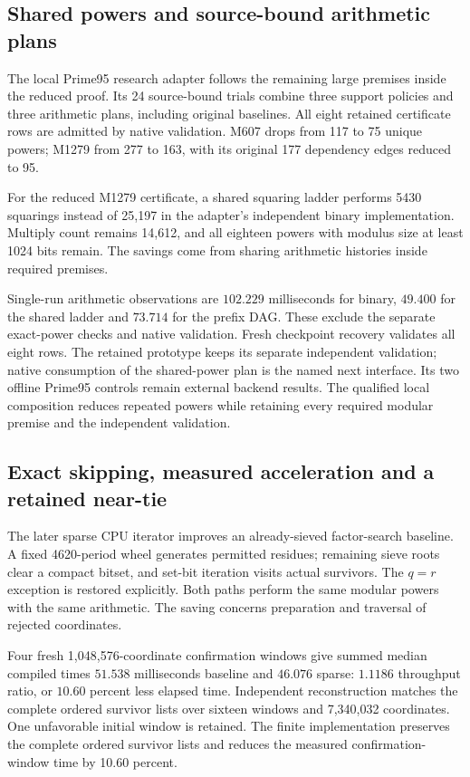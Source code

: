 \subsection{Shared powers and source-bound arithmetic plans}

The local Prime95 research adapter follows the remaining
large premises inside the reduced proof. Its 24 source-bound
trials combine three support policies and three arithmetic
plans, including original baselines. All eight retained
certificate rows are admitted by native validation.
M607 drops from 117 to 75 unique powers; M1279 from
277 to 163, with its original 177 dependency edges
reduced to 95.

For the reduced M1279 certificate, a shared squaring
ladder performs 5430 squarings instead of 25,197 in
the adapter's independent binary implementation.
Multiply count remains 14,612, and all eighteen powers
with modulus size at least 1024 bits remain.
The savings come from sharing arithmetic histories
inside required premises.

Single-run arithmetic observations are \(102.229\)
milliseconds for binary, \(49.400\) for the shared
ladder and \(73.714\) for the prefix DAG. These exclude
the separate exact-power checks and native validation.
Fresh checkpoint recovery validates all eight rows.
The retained prototype keeps its separate independent
validation; native consumption of the shared-power
plan is the named next interface. Its two offline
Prime95 controls remain external backend results.
The qualified local composition reduces repeated powers while retaining every required modular premise and the independent validation.

\subsection{Exact skipping, measured acceleration and a retained near-tie}

The later sparse CPU iterator improves an already-sieved
factor-search baseline. A fixed 4620-period wheel generates
permitted residues; remaining sieve roots clear a compact
bitset, and set-bit iteration visits actual survivors.
The \(q=r\) exception is restored explicitly. Both paths
perform the same modular powers with the same arithmetic.
The saving concerns preparation and traversal of rejected
coordinates.

Four fresh 1,048,576-coordinate confirmation windows give
summed median compiled times \(51.538\) milliseconds
baseline and \(46.076\) sparse: \(1.1186\) throughput
ratio, or \(10.60\) percent less elapsed time.
Independent reconstruction matches the complete ordered
survivor lists over sixteen windows and 7,340,032
coordinates. One unfavorable initial window is retained.
The finite implementation preserves the complete ordered survivor lists and reduces the measured confirmation-window time by 10.60 percent.

